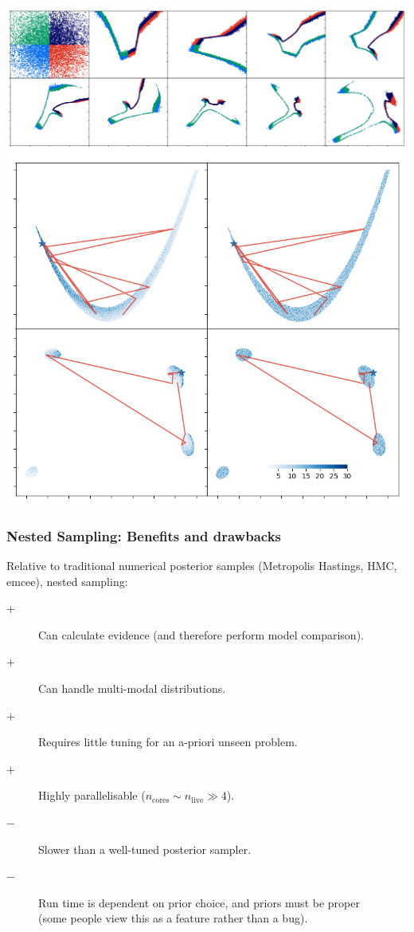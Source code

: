 \documentclass[aspectratio=169]{beamer}
\begin{document}
\begin{frame}
{{                \includegraphics[width=\textwidth]{figures/himmelblau_flow.png}
            }{
                \includegraphics[width=\textwidth]{figures/chains.png}
            }
            \vfill
    }
\end{frame}

\begin{frame}
    \frametitle{Nested Sampling: Benefits and drawbacks}
    Relative to traditional numerical posterior samples (Metropolis Hastings, HMC, emcee), nested sampling:
    \begin{description}
        \item[$+$] Can calculate evidence (and therefore perform model comparison).
        \item[$+$] Can handle multi-modal distributions.
        \item[$+$] Requires little tuning for an a-priori unseen problem.
        \item[$+$] Highly parallelisable ($n_\mathrm{cores} \sim n_\mathrm{live} \gg 4$).
        \item[$-$] Slower than a well-tuned posterior sampler.
        \item[$-$] Run time is dependent on prior choice, and priors must be proper \\(some people view this as a feature rather than a bug).
    \end{description}
\end{frame}
\end{document}
